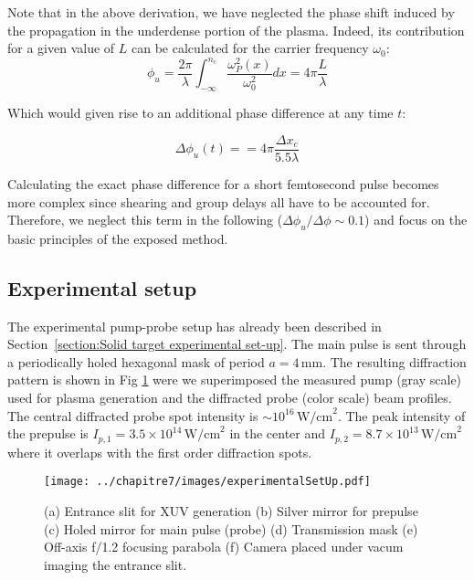 \noindent Note that in the above derivation, we have neglected the phase shift induced by the propagation in the underdense portion of the plasma. Indeed, its contribution for a given value of $L$ can be calculated for the carrier frequency $\omega_0$:
\begin{equation}
 \phi_{u} = \frac{2\pi}{\lambda}\int_{-\infty}^{n_c}\frac{\omega_P^2(x)}{\omega_0^2}dx = 4\pi\frac{L}{\lambda}
\end{equation}

Which would given rise to an additional phase difference at any time $t$:

\begin{equation}
\Delta \phi_{u}(t) = = 4\pi\frac{\Delta x_c}{5.5 \lambda}
\end{equation}

\noindent Calculating the exact phase difference for a short femtosecond pulse becomes more complex since shearing and group delays all have to be accounted for. Therefore, we neglect this term  in the following ($\Delta \phi_u /\Delta \phi \sim 0.1$) and focus on the basic principles of the exposed method. 


\subsection{Experimental setup}

The experimental pump-probe setup has already been described in Section~\ref{section:Solid target experimental set-up}.
 The  main pulse is sent through a periodically holed hexagonal mask of period $a = 4\,\mathrm{mm}$. The resulting diffraction pattern is shown in Fig \ref{fig:experimentalSetUp} were we superimposed the measured pump (gray scale) used for plasma generation and the diffracted probe (color scale) beam profiles. The central diffracted probe spot intensity is $\sim 10^{16}\,\mathrm{W/cm}^2$. The peak intensity of the prepulse is $I_{p,1} = 3.5\times 10^{14}\,\mathrm{W/cm}^2$ in the center and $I_{p,2} = 8.7\times 10^{13}\,\mathrm{W/cm}^2$ where it overlaps with the first order diffraction spots.

\begin{figure}[H]
\centering
\texttt{[image: ../chapitre7/images/experimentalSetUp.pdf]}\\
\caption{\label{fig:experimentalSetUp} (a) Entrance slit for XUV generation (b) Silver mirror for prepulse (c) Holed mirror for main pulse (probe) (d) Transmission mask (e) Off-axis f/1.2 focusing parabola (f) Camera placed under vacum imaging the entrance slit.}
\end{figure}

